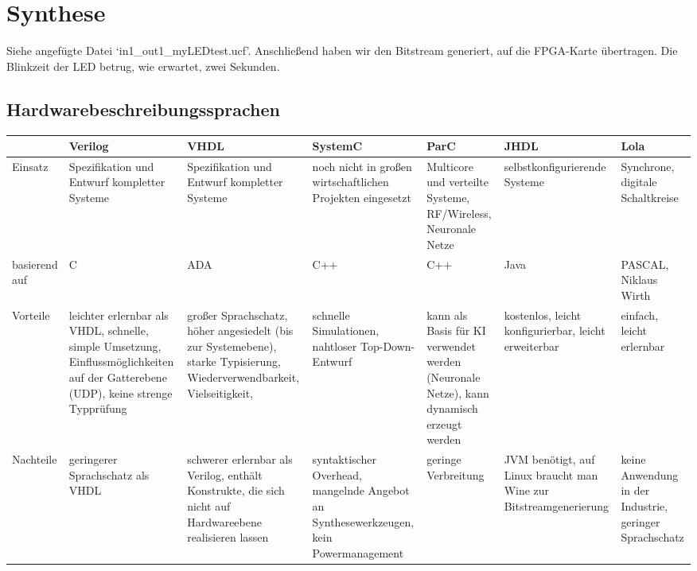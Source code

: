 \documentclass[a4paper, 11pt]{article}
\theoremstyle{definition}
\theoremstyle{plain}
\begin{document}
\section{Synthese}
Siehe angefügte Datei `in1\_out1\_myLEDtest.ucf'. Anschließend haben wir den Bitstream generiert, auf die FPGA-Karte übertragen. Die Blinkzeit der LED betrug, wie erwartet, zwei Sekunden.


\begin{landscape}
\section{Hardwarebeschreibungssprachen}
\begin{tabular}{p{2cm}|p{3cm}|p{3cm}|p{3cm}|p{3cm}|p{3cm}|p{3cm}}
 & \textbf{Verilog} & \textbf{VHDL} & \textbf{SystemC} & \textbf{ParC} & \textbf{JHDL} & \textbf{Lola}\\
\hline 
Einsatz & Spezifikation und Entwurf kompletter Systeme & Spezifikation und Entwurf kompletter Systeme & noch nicht in großen wirtschaftlichen Projekten eingesetzt & Multicore und verteilte Systeme, RF/Wireless, Neuronale Netze & selbstkonfigurierende Systeme & Synchrone, digitale Schaltkreise \\
\hline
basierend auf & C & ADA & C++ & C++ & Java & PASCAL, Niklaus Wirth \\
\hline
Vorteile & leichter erlernbar als VHDL, schnelle, simple Umsetzung, Einflussmöglichkeiten auf der Gatterebene (UDP), keine strenge Typprüfung & großer Sprachschatz, höher angesiedelt (bis zur Systemebene), starke Typisierung, Wiederverwendbarkeit, Vielseitigkeit,  & schnelle Simulationen, nahtloser Top-Down-Entwurf & kann als Basis für KI verwendet werden (Neuronale Netze), kann dynamisch erzeugt werden & kostenlos, leicht konfigurierbar, leicht erweiterbar & einfach, leicht erlernbar \\
\hline
Nachteile & geringerer Sprachschatz als VHDL & schwerer erlernbar als Verilog, enthält Konstrukte, die sich nicht auf Hardwareebene realisieren lassen & syntaktischer Overhead, mangelnde Angebot an Synthesewerkzeugen, kein Powermanagement & geringe Verbreitung & JVM benötigt, auf Linux braucht man Wine zur Bitstreamgenerierung & keine Anwendung in der Industrie, geringer Sprachschatz \\
\end{tabular}



\end{landscape}
\end{document}
